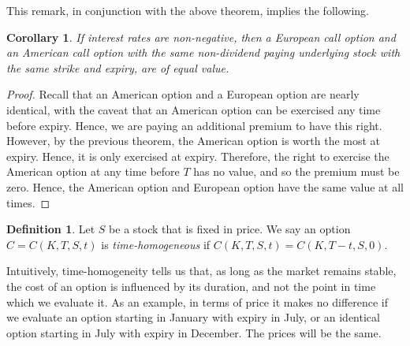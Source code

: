 \documentclass[12pt]{amsbook}
\theoremstyle{plain}
\newtheorem{corollary}[theorem]{Corollary}
\theoremstyle{definition}
\newtheorem*{definition}{Definition}
\theoremstyle{remark}
\numberwithin{equation}{section}  %
\begin{document}
This remark, in conjunction with the above theorem, implies the following.
\begin{corollary}\label{cor:am-eu-equiv}
	If interest rates are non-negative, then a European call option and an 
	American call option with the same
	non-dividend paying underlying stock with the same strike and expiry, are 
	of equal value.
\end{corollary}
\begin{proof}
	Recall that an American option and a European option are nearly identical,
	with the caveat that an American option can be exercised any time before 
	expiry.
	Hence, we are paying an additional premium to have this right.
	However, by the previous theorem, the American option is worth the most at 
	expiry.
	Hence, it is only exercised at expiry. Therefore, the right to exercise
	the American option at any time before $T$ has no value, and so the premium
	must be zero. Hence, the American option and European option have the same 
	value at all times.
\end{proof}
\begin{definition}
	Let $S$ be a stock that is fixed in price.
	We say an option $C = C(K, T, S, t)$  is \emph{time-homogeneous} 
	if $C(K, T, S, t) = C(K, T-t, S, 0)$.
\end{definition}
Intuitively, time-homogeneity tells us that, as long as the market remains
stable, the cost of an option is influenced by its duration, and not the point
in time which we evaluate it. As an example, in terms of price it makes no difference if we evaluate an option starting in January with expiry in July, or an identical option starting in July with expiry in December.  The prices will be the same.
\end{document}
